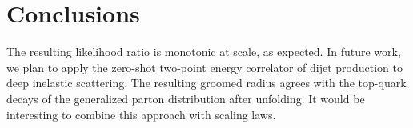 \section{Conclusions}\label{sec:conclusions}

The resulting likelihood ratio is monotonic at scale, as expected. In
future work, we plan to apply the zero-shot two-point energy correlator
of dijet production to deep inelastic scattering. The resulting groomed
radius agrees with the top-quark decays of the generalized parton
distribution after unfolding. It would be interesting to combine this
approach with scaling laws.

